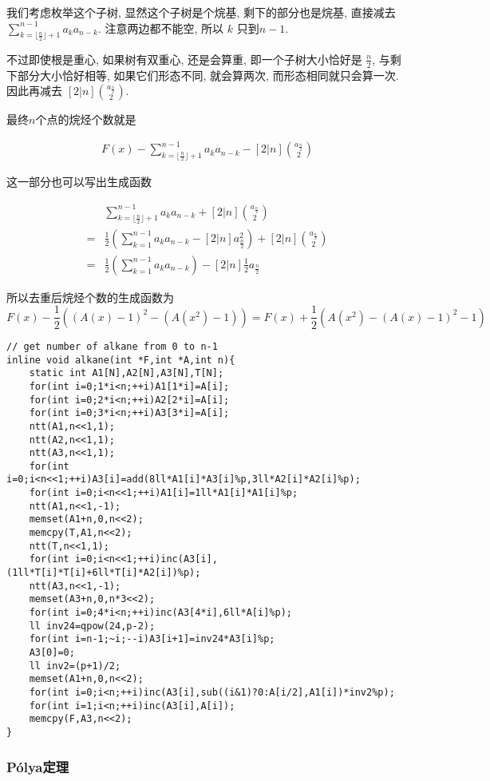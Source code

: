\documentclass{ctexart}
\begin{document}
我们考虑枚举这个子树, 显然这个子树是个烷基, 剩下的部分也是烷基, 
直接减去 $\sum_{k=\lfloor \frac{n}{2} \rfloor+1}^{n-1}a_k a_{n-k}$.
注意两边都不能空, 所以 $k$ 只到$n-1$.

不过即使根是重心, 如果树有双重心, 还是会算重,
即一个子树大小恰好是 $\frac{n}{2}$, 与剩下部分大小恰好相等, 如果它们形态不同, 就会算两次, 而形态相同就只会算一次.
因此再减去 $[2|n]\binom{a_{\frac{n}{2}}}{2}$.

最终$n$个点的烷烃个数就是

\begin{align*}
    [x^n]F(x)-\sum_{k=\lfloor \frac{n}{2} \rfloor+1}^{n-1}a_k a_{n-k} - [2|n]\binom{a_{\frac{n}{2}}}{2}
\end{align*}

这一部分也可以写出生成函数

\begin{align*}
     &\sum_{k=\lfloor \frac{n}{2} \rfloor+1}^{n-1}a_k a_{n-k} + [2|n]\binom{a_{\frac{n}{2}}}{2}\\
    =&\frac{1}{2}(\sum_{k=1}^{n-1}a_k a_{n-k}-[2|n]a_{\frac{n}{2}}^2)+ [2|n]\binom{a_{\frac{n}{2}}}{2}\\
    =&\frac{1}{2}(\sum_{k=1}^{n-1}a_k a_{n-k})-[2|n] \frac{1}{2}a_{\frac{n}{2}}
\end{align*}

所以去重后烷烃个数的生成函数为
$$
    F(x)-\frac{1}{2}((A(x)-1)^2-(A(x^2)-1))=F(x)+\frac{1}{2}(A(x^2)-(A(x)-1)^2-1)
$$

\begin{lstlisting}
// get number of alkane from 0 to n-1
inline void alkane(int *F,int *A,int n){
    static int A1[N],A2[N],A3[N],T[N];
    for(int i=0;1*i<n;++i)A1[1*i]=A[i];
    for(int i=0;2*i<n;++i)A2[2*i]=A[i];
    for(int i=0;3*i<n;++i)A3[3*i]=A[i];
    ntt(A1,n<<1,1);
    ntt(A2,n<<1,1);
    ntt(A3,n<<1,1);
    for(int i=0;i<n<<1;++i)A3[i]=add(8ll*A1[i]*A3[i]%p,3ll*A2[i]*A2[i]%p);
    for(int i=0;i<n<<1;++i)A1[i]=1ll*A1[i]*A1[i]%p;
    ntt(A1,n<<1,-1);
    memset(A1+n,0,n<<2);
    memcpy(T,A1,n<<2);
    ntt(T,n<<1,1);
    for(int i=0;i<n<<1;++i)inc(A3[i],(1ll*T[i]*T[i]+6ll*T[i]*A2[i])%p);
    ntt(A3,n<<1,-1);
    memset(A3+n,0,n*3<<2);
    for(int i=0;4*i<n;++i)inc(A3[4*i],6ll*A[i]%p);
    ll inv24=qpow(24,p-2);
    for(int i=n-1;~i;--i)A3[i+1]=inv24*A3[i]%p;
    A3[0]=0;
    ll inv2=(p+1)/2;
    memset(A1+n,0,n<<2);
    for(int i=0;i<n;++i)inc(A3[i],sub((i&1)?0:A[i/2],A1[i])*inv2%p);
    for(int i=1;i<n;++i)inc(A3[i],A[i]);
    memcpy(F,A3,n<<2);
}
\end{lstlisting}
\subsubsection{Pólya定理}
\end{document}
